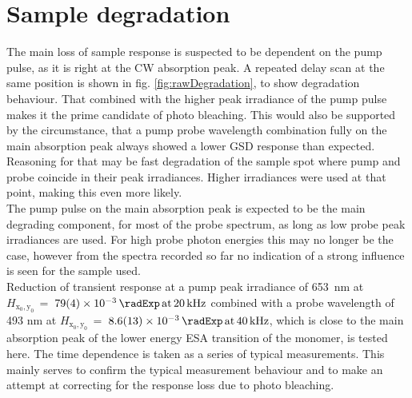 \documentclass[twoside,openright,listof=numbered]{scrreprt}
\def\pumpExp#1{\ensuremath{\SI{#1}{\radExp}\,\mathrm{at}\, \SI{20}{\kilo\hertz}}}
\def\probeExp#1{\ensuremath{\SI{#1}{\radExp}\,\mathrm{at}\, \SI{40}{\kilo\hertz}}}
\def\radiantExp{\ensuremath{H_\mathrm{x_0,y_0}}}
\begin{document}
\section{Sample degradation}\label{sec:degradation}
The main loss of sample response is suspected to be dependent on the pump pulse, as it is right at the CW absorption peak. A repeated delay scan at the same position is shown in fig. \ref{fig:rawDegradation}, to show degradation behaviour. That combined with the higher peak irradiance of the pump pulse makes it the prime candidate of photo bleaching. This would also be supported by the circumstance, that a pump probe wavelength combination fully on the main absorption peak always showed a lower GSD response than expected. Reasoning for that may be fast degradation of the sample spot where pump and probe coincide in their peak irradiances. Higher irradiances were used at that point, making this even more likely.\\
The pump pulse on the main absorption peak is expected to be the main degrading component, for most of the probe spectrum, as long as low probe peak irradiances are used. For high probe photon energies this may no longer be the case, however from the spectra recorded so far no indication of a strong influence is seen for the sample used.\\
Reduction of transient response at a pump peak irradiance of \qty{653}{\nano\meter} at $\radiantExp\,=\;$\pumpExp{79(4)e-3} combined with a probe wavelength of 493 nm at $\radiantExp\,=\;$\probeExp{8.6(1.3)e-3}, which is close to the main absorption peak of the lower energy ESA transition of the monomer, is tested here. The time dependence is taken as a series of typical measurements. This mainly serves to confirm the typical measurement behaviour and to make an attempt at correcting for the response loss due to photo bleaching.
\end{document}
